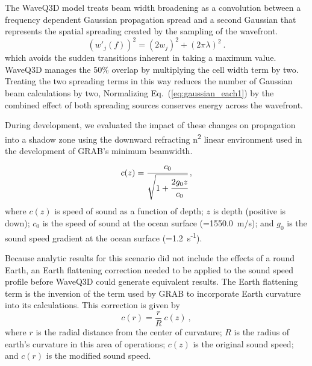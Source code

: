 \documentclass{ws-jca}
\begin{document}
The WaveQ3D model treats beam width broadening as a convolution between a
frequency dependent Gaussian propagation spread and a second Gaussian that
represents the spatial spreading created by the sampling of the wavefront.
\begin{equation}
	(w'_j(f))^2 = \left( 2 w_j \right)^2 + \left( 2 \pi \lambda \right)^2 \:.
	\label{eq:new_width}
\end{equation}
which avoids the sudden transitions inherent in taking a maximum value.
WaveQ3D manages the 50\% overlap by multiplying the cell width term by two.  Treating the two spreading terms in this way reduces the number of Gaussian beam calculations by two,  Normalizing
Eq.~(\ref{eq:gaussian_each1}) by the combined effect of both spreading sources conserves energy across the wavefront.

During development, we evaluated the impact of these changes on propagation into a shadow zone using the downward refracting n\textsuperscript{2} linear environment used in the development of GRAB's minimum beamwidth.
\begin{equation}
	c(z) = \cfrac{c_0}{\sqrt{1+\cfrac{2 g_0 z}{c_0}}} \:,
	\label{eq:n2_linear}
\end{equation}
where
\(c(z)\) is speed of sound as a function of depth;
\(z\) is depth (positive is down);
\(c_0\) is the speed of sound at the ocean surface (=1550.0~m/s); and
\(g_0\) is the sound speed gradient at the ocean surface
(=1.2~s\textsuperscript{-1}).

Because analytic results for this scenario did not include the effects of a round Earth, an Earth flattening correction needed to be applied to the sound speed profile before WaveQ3D could generate equivalent results.  The Earth flattening term is the inversion of the term used by GRAB to incorporate Earth curvature into its calculations.\cite{Pekeris1946} This correction is given by
\begin{equation}
	c(r) = \frac{r}{R} \: c(z) \:, 
	\label{eq:n2_correction}
\end{equation}
where
$r$ is the radial distance from the center of curvature;
$R$ is the radius of earth's curvature in this area of operations;
$c(z)$ is the original sound speed; and
$c(r)$ is the modified sound speed.
\end{document}
